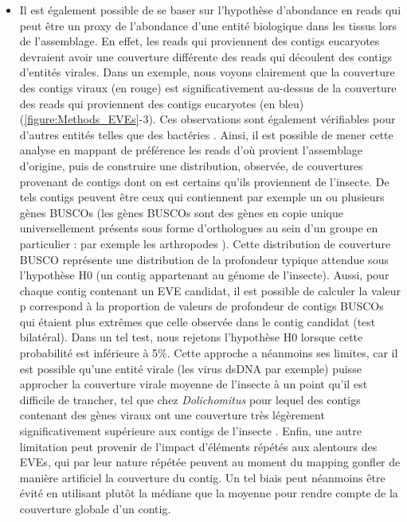 \begin{itemize}
    \item Il est également possible de se baser sur l'hypothèse d'abondance en reads qui peut être un proxy de l'abondance d'une entité biologique dans les tissus lors de l'assemblage. En effet, les reads qui proviennent des contigs eucaryotes devraient avoir une couverture différente des reads qui découlent des contigs d'entités virales. Dans un exemple, nous voyons clairement que la couverture des contigs viraux (en rouge) est significativement au-dessus de la couverture des reads qui proviennent des contigs eucaryotes (en bleu) (\figurename{\ref{figure:Methods_EVEs}}-3). Ces observations sont également vérifiables pour d'autres entités telles que des bactéries \citep{di_giovanni_behavior-manipulating_2020,burke_presence_2021}. Ainsi, il est possible de mener cette analyse en mappant de préférence les reads d'où provient l'assemblage d'origine, puis de construire une distribution, observée, de couvertures provenant de contigs dont on est certains qu'ils proviennent de l'insecte. De tels contigs peuvent être ceux qui contiennent par exemple un ou plusieurs gènes BUSCOs (les gènes BUSCOs sont des gènes en copie unique universellement présents sous forme d'orthologues au sein d'un groupe en particulier : par exemple les arthropodes \citep{simao_busco_2015}). Cette distribution de couverture BUSCO représente une distribution de la profondeur typique attendue sous l'hypothèse H0 (un contig appartenant au génome de l'insecte). Aussi, pour chaque contig contenant un EVE candidat, il est possible de calculer la valeur p correspond à la proportion de valeurs de profondeur de contigs BUSCOs qui étaient plus extrêmes que celle observée dans le contig candidat (test bilatéral). Dans un tel test, nous rejetons l'hypothèse H0 lorsque cette probabilité est inférieure à 5\%. Cette approche a néanmoins ses limites, car il est possible qu'une entité virale (les virus dsDNA par exemple) puisse approcher la couverture virale moyenne de l'insecte à un point qu'il est difficile de trancher, tel que chez \textit{Dolichomitus} pour lequel des contigs contenant des gènes viraux ont une couverture très légèrement significativement supérieure aux contigs de l'insecte \citep{burke_deep_2012}. Enfin, une autre limitation peut provenir de l'impact d'éléments répétés aux alentours des EVEs, qui par leur nature répétée peuvent au moment du mapping gonfler de manière artificiel la couverture du contig. Un tel biais peut néanmoins être évité en utilisant plutôt la médiane que la moyenne pour rendre compte de la couverture globale d'un contig. 


\end{itemize}
